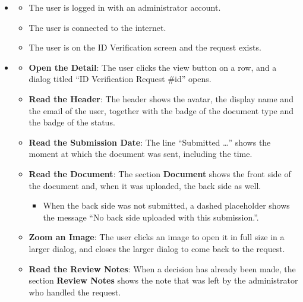 
\begin{itemize}[leftmargin=1.6em,topsep=4pt,itemsep=3pt,parsep=0pt,label=$\bullet$]
    \item {}
        \begin{itemize}[leftmargin=2.2em,topsep=2pt,itemsep=3pt,parsep=0pt,label=$\circ$]
            \item The user is logged in with an administrator account.
            \item The user is connected to the internet.
            \item The user is on the ID Verification screen and the request exists.
        \end{itemize}
    \item {}
        \begin{itemize}[leftmargin=2.2em,topsep=2pt,itemsep=3pt,parsep=0pt,label=$\circ$]
            \item \textbf{Open the Detail}: The user clicks the view button on a row, and a dialog titled ``ID Verification Request \#id'' opens.
            \item \textbf{Read the Header}: The header shows the avatar, the display name and the email of the user, together with the badge of the document type and the badge of the status.
            \item \textbf{Read the Submission Date}: The line ``Submitted \dots'' shows the moment at which the document was sent, including the time.
            \item \textbf{Read the Document}: The section \textbf{Document} shows the front side of the document and, when it was uploaded, the back side as well.
                \begin{itemize}[leftmargin=2.2em,topsep=2pt,itemsep=3pt,parsep=0pt,label=$\blacksquare$]
                    \item When the back side was not submitted, a dashed placeholder shows the message ``No back side uploaded with this submission.''.
                \end{itemize}
            \item \textbf{Zoom an Image}: The user clicks an image to open it in full size in a larger dialog, and closes the larger dialog to come back to the request.
            \item \textbf{Read the Review Notes}: When a decision has already been made, the section \textbf{Review Notes} shows the note that was left by the administrator who handled the request.

\end{itemize}
\end{itemize}
